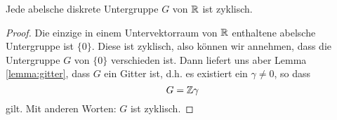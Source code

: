 \begin{cor}
  \label{cor:gitter}
  Jede abelsche diskrete Untergruppe $G$ von $\mathbb{R}$ ist zyklisch.
\end{cor}

\begin{proof}
  Die einzige in einem Untervektorraum von $\mathbb{R}$ enthaltene abelsche
  Untergruppe ist $\{0\}$. Diese ist zyklisch, also können wir
  annehmen, dass die Untergruppe $G$ von $\{0\}$ verschieden ist. Dann
  liefert uns aber Lemma \ref{lemma:gitter}, dass $G$ ein Gitter ist,
  d.h. es existiert ein $\gamma \neq 0$, so dass
  \[
  G = \mathbb{Z} \gamma
  \]
  gilt. Mit anderen Worten: $G$ ist zyklisch.
\end{proof}

